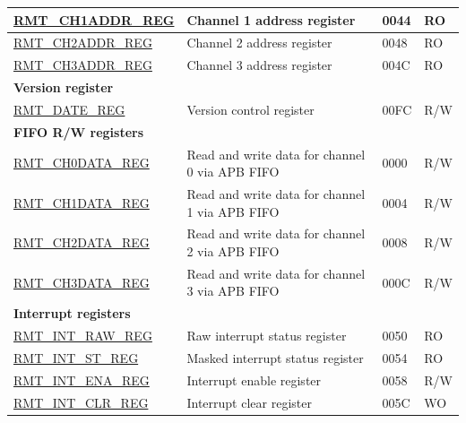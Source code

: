 \begin{longtable}{ | p{5.5cm} | p{7cm} | p{1.5cm} | p{1cm} | }
\hyperref[regdesc:RMTCHNADDRREG]{RMT\_CH1ADDR\_REG} & Channel 1 address register & \hexprefix{}0044 & RO \\ \hline
\hyperref[regdesc:RMTCHNADDRREG]{RMT\_CH2ADDR\_REG} & Channel 2 address register & \hexprefix{}0048 & RO \\ \hline
\hyperref[regdesc:RMTCHNADDRREG]{RMT\_CH3ADDR\_REG} & Channel 3 address register & \hexprefix{}004C & RO \\ \hline
\multicolumn{4}{|l|}{\textbf{Version register}} \\ \hline
\hyperref[regdesc:RMTDATEREG]{RMT\_DATE\_REG} & Version control register & \hexprefix{}00FC & R/W \\ \hline
\multicolumn{4}{|l|}{\textbf{FIFO R/W registers}} \\ \hline
\hyperref[regdesc:RMTCHNDATAREG]{RMT\_CH0DATA\_REG} & Read and write data for channel 0 via APB FIFO & \hexprefix{}0000 & R/W \\ \hline
\hyperref[regdesc:RMTCHNDATAREG]{RMT\_CH1DATA\_REG} & Read and write data for channel 1 via APB FIFO & \hexprefix{}0004 & R/W \\ \hline
\hyperref[regdesc:RMTCHNDATAREG]{RMT\_CH2DATA\_REG} & Read and write data for channel 2 via APB FIFO & \hexprefix{}0008 & R/W \\ \hline
\hyperref[regdesc:RMTCHNDATAREG]{RMT\_CH3DATA\_REG} & Read and write data for channel 3 via APB FIFO & \hexprefix{}000C & R/W \\ \hline
\multicolumn{4}{|l|}{\textbf{Interrupt registers}} \\ \hline
\hyperref[regdesc:RMTINTRAWREG]{RMT\_INT\_RAW\_REG} & Raw interrupt status register & \hexprefix{}0050 & RO \\ \hline
\hyperref[regdesc:RMTINTSTREG]{RMT\_INT\_ST\_REG} & Masked interrupt status register & \hexprefix{}0054 & RO \\ \hline
\hyperref[regdesc:RMTINTENAREG]{RMT\_INT\_ENA\_REG} & Interrupt enable register & \hexprefix{}0058 & R/W \\ \hline
\hyperref[regdesc:RMTINTCLRREG]{RMT\_INT\_CLR\_REG} & Interrupt clear register & \hexprefix{}005C & WO \\ \hline
\end{longtable}

